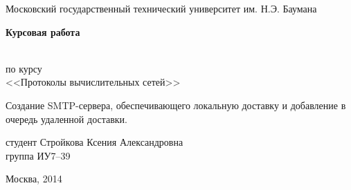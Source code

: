 

\thispagestyle{empty}

\begin{center}
\begin{small}
Московский государственный технический университет им. Н.Э. Баумана
\end{small}

\vspace{6cm}

\begin{Large}\textbf{Курсовая работа}\end{Large}\\

по курсу \\
<<Протоколы вычислительных сетей>> \\
\begin{Large}
Создание SMTP-сервера, обеспечивающего локальную доставку и добавление в очередь удаленной доставки.
\end{Large}

\vspace{4cm}

\begin{flushright}
студент	Стройкова Ксения Александровна\\
группа ИУ7--39\\

\end{flushright}

\vspace{8cm}

\begin{small}Москва, 2014\end{small}

\end{center}
